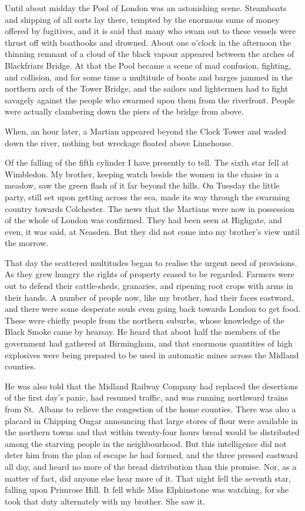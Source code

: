 Until about midday the Pool of London was an astonishing scene.
Steamboats and shipping of all sorts lay there, tempted by the
enormous sums of money offered by fugitives, and it is said that
many who swam out to these vessels were thrust off with boathooks
and drowned. About one o'clock in the afternoon the thinning
remnant of a cloud of the black vapour appeared between the arches
of Blackfriars Bridge. At that the Pool became a scene of mad
confusion, fighting, and collision, and for some time a multitude
of boats and barges jammed in the northern arch of the Tower
Bridge, and the sailors and lightermen had to fight savagely
against the people who swarmed upon them from the riverfront.
People were actually clambering down the piers of the bridge from
above.

When, an hour later, a Martian appeared beyond the Clock Tower and
waded down the river, nothing but wreckage floated above
Limehouse.

Of the falling of the fifth cylinder I have presently to tell. The
sixth star fell at Wimbledon. My brother, keeping watch beside the
women in the chaise in a meadow, saw the green flash of it far
beyond the hills. On Tuesday the little party, still set upon
getting across the sea, made its way through the swarming country
towards Colchester. The news that the Martians were now in
possession of the whole of London was confirmed. They had been seen
at Highgate, and even, it was said, at Neasden. But they did not
come into my brother's view until the morrow.

That day the scattered multitudes began to realise the urgent need
of provisions. As they grew hungry the rights of property ceased to
be regarded. Farmers were out to defend their cattle-sheds,
granaries, and ripening root crops with arms in their hands. A
number of people now, like my brother, had their faces eastward,
and there were some desperate souls even going back towards London
to get food. These were chiefly people from the northern suburbs,
whose knowledge of the Black Smoke came by hearsay. He heard that
about half the members of the government had gathered at
Birmingham, and that enormous quantities of high explosives were
being prepared to be used in automatic mines across the Midland
counties.

He was also told that the Midland Railway Company had replaced the
desertions of the first day's panic, had resumed traffic, and was
running northward trains from St.\ Albans to relieve the congestion
of the home counties. There was also a placard in Chipping Ongar
announcing that large stores of flour were available in the
northern towns and that within twenty-four hours bread would be
distributed among the starving people in the neighbourhood. But
this intelligence did not deter him from the plan of escape he had
formed, and the three pressed eastward all day, and heard no more
of the bread distribution than this promise. Nor, as a matter of
fact, did anyone else hear more of it. That night fell the seventh
star, falling upon Primrose Hill. It fell while Miss Elphinstone
was watching, for she took that duty alternately with my brother.
She saw it.

